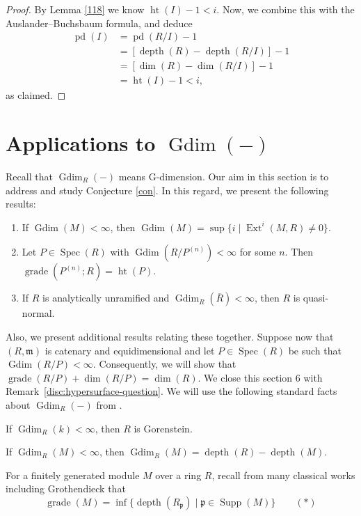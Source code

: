 \documentclass[11.05pt,a4paper]{amsart}
\theoremstyle{definition}
\theoremstyle{remark}
\newcommand{\grade}{\operatorname{grade}}
\newcommand{\Spec}{\operatorname{Spec}}
\newcommand{\pd}{\operatorname{pd}}
\newcommand{\Gdim}{\operatorname{Gdim}}
\newcommand{\Ext}{\operatorname{Ext}}
\newcommand{\Supp}{\operatorname{Supp}}
\newcommand{\depth}{\operatorname{depth}}
\begin{document}
\begin{proof}
	By Lemma \ref{118} 
we know $	\operatorname{ht}(I) - 1  < i$. Now, we combine this with the Auslander–Buchsbaum formula, and deduce
	\begin{align*}
	\pd(I)
	&= \pd(R/I) - 1 \\
	&= [\depth(R)  - \depth(R /I)] - 1 \\
	&= [ \dim (R) - \dim ( R/I) ] - 1 \\
	&= \operatorname{ht}(I) - 1 < i,
	\end{align*}
	as claimed.
\end{proof}
\medskip
\section{Applications to $\Gdim(-)$}
Recall that $\Gdim_R(-)$ means G-dimension.
Our aim in this section is to address and study Conjecture \ref{con}. In this regard, we present the following results:

\begin{enumerate}
	\item[$\bullet$]	If $\Gdim(M) < \infty$, then 
	\( 
	\Gdim(M) = \sup\{ i \mid \Ext^i(M,R) \neq 0 \}.
	\) 
	\item[$\bullet$] 	Let $P \in \Spec(R)$ with $\Gdim(R/P^{(n)}) < \infty$ for some $n$. Then 
	$\grade(P^{(n)}; R) = \operatorname{ht}(P)$.
	\item[$\bullet$]  If $R$ is analytically unramified and $\Gdim_R(\overline{R}) < \infty$, then $R$ is quasi-normal.
\end{enumerate}

Also, we present additional results relating these together.
Suppose now that $(R,\mathfrak{m})$ is catenary and equidimensional and let $P \in \Spec(R)$ be such that $\Gdim(R/P) < \infty$. Consequently, we will show that
\(
\grade(R/P) + \dim (R/P) = \dim (R).
\) We close this section 6 with Remark~\ref{disc:hypersurface-question}.
We will use the following standard facts about $\Gdim_R(-)$ from \cite{AB}.

\begin{fact}\label{gd}
	If $\Gdim_R(k)<\infty$, then $R$ is Gorenstein.
\end{fact}

\begin{fact}\label{gd2}
	If $\Gdim_R(M)<\infty$, then $\Gdim_R(M)=\depth(R)-\depth(M)$.
\end{fact}

\begin{fact}\label{grs}
	For a finitely generated module $M$ over a  ring $R$, recall from many classical works including Grothendieck that
	\[
	\grade(M) = \inf\{ \depth(R_{\mathfrak{p}}) \mid \mathfrak{p} \in \Supp(M) \} \qquad (\ast)
	\]
\end{fact}
\end{document}
